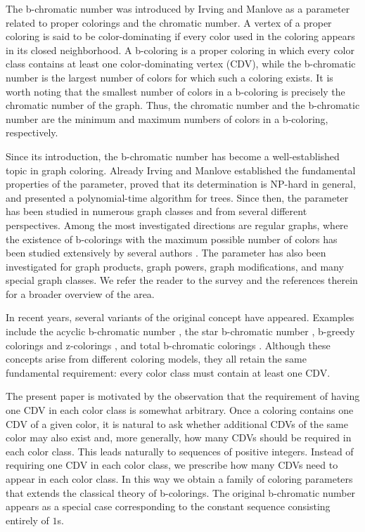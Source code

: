 \documentclass{article}
\theoremstyle{definition}
\begin{document}
The b-chromatic number was introduced by Irving and Manlove \cite{Irving} as a parameter related to proper colorings and the chromatic number. A vertex of a proper coloring is said to be color-dominating if every color used in the coloring appears in its closed neighborhood. A b-coloring is a proper coloring in which every color class contains at least one color-dominating vertex (CDV), while the b-chromatic number is the largest number of colors for which such a coloring exists. It is worth noting that the smallest number of colors in a b-coloring is precisely the chromatic number of the graph. Thus, the chromatic number and the b-chromatic number are the minimum and maximum numbers of colors in a b-coloring, respectively.

Since its introduction, the b-chromatic number has become a well-established topic in graph coloring. Already Irving and Manlove \cite{Irving} established the fundamental properties of the parameter, proved that its determination is NP-hard in general, 
and presented a polynomial-time algorithm for trees. Since then, the parameter has been studied in numerous graph classes and from several different perspectives. Among the most investigated directions are regular graphs, where the existence of b-colorings with the maximum possible number of colors has been studied extensively by several authors \cite{BlidiaRegular,Cabello,Dettlaff,SahiliRegular,ShaebaniRegNoQuad}. The parameter has also been investigated for graph products, graph powers, graph modifications, and many special graph classes. We refer the reader to the survey \cite{JakovacSurvey} and the references therein for a broader overview of the area.

In recent years, several variants of the original concept have appeared. Examples include the acyclic b-chromatic number \cite{Anholcer}, the star b-chromatic number \cite{Bozovic}, b-greedy colorings and z-colorings \cite{Costa}, and total b-chromatic colorings \cite{Mendoza}. Although these concepts arise from different coloring models, they all retain the same fundamental requirement: every color class must contain at least one CDV.

The present paper is motivated by the observation that the requirement of having one CDV in each color class is somewhat arbitrary. Once a coloring contains one CDV of a given color, it is natural to ask whether additional CDVs of the same color may also exist and, more generally, how many CDVs should be required in each color class. This leads naturally to sequences of positive integers. Instead of requiring one CDV in each color class, we prescribe how many CDVs need to appear in each color class. In this way we obtain a family of coloring parameters that extends the classical theory of b-colorings. The original b-chromatic number appears as a special case corresponding to the constant sequence consisting entirely of $1$s.
\end{document}
